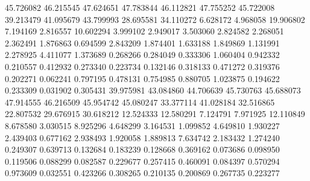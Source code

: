 45.726082
46.215545
47.624651
47.783844
46.112821
47.755252
45.722008
39.213479
41.095679
43.799993
28.695581
34.110272
6.628172
4.968058
19.906802
7.194169
2.816557
10.602294
3.999102
2.949017
3.503060
2.824582
2.268051
2.362491
1.876863
0.694599
2.843209
1.874401
1.633188
1.849869
1.131991
2.278925
4.411077
1.373689
0.268266
0.284049
0.333306
1.060404
0.942332
0.210557
0.412932
0.273340
0.223734
0.132146
0.318133
0.471272
0.319376
0.202271
0.062241
0.797195
0.478131
0.754985
0.880705
1.023875
0.194622
0.233309
0.031902
0.305431
39.975981
43.084860
44.706639
45.730763
45.688073
47.914555
46.216509
45.954742
45.080247
33.377114
41.028184
32.516865
22.807532
29.676915
30.618212
12.524333
12.580291
7.124791
7.971925
12.110849
8.678580
3.030515
8.925296
4.648299
3.164531
1.099852
4.649810
1.930227
2.439403
0.677162
2.938493
1.920058
1.889813
7.634742
2.183432
1.274240
0.249307
0.639713
0.132684
0.183239
0.128668
0.369162
0.073686
0.098950
0.119506
0.088299
0.082587
0.229677
0.257415
0.460091
0.084397
0.570294
0.973609
0.032551
0.423266
0.308265
0.210135
0.200869
0.267735
0.223277
